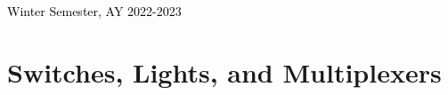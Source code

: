 \documentclass[a4paper, 12pt]{report}
\providecommand{\phantomsection}{}
\begin{document}
\begin{titlepage}
\begin{table}[h]
\begin{tabular}{rll}
\end{tabular}
\end{table}
\vspace{1cm}
\begin{center}
{\textcolor{black}{\footnotesize Winter Semester, AY 2022-2023}}
\end{center}
\end{titlepage}


%


\newpage
\tableofcontents
\newpage
\phantomsection{}
\listoftables


\cleardoublepage
\phantomsection{}
\listoffigures

\mainmatter%
\chapter{Switches, Lights, and Multiplexers}
\end{document}

